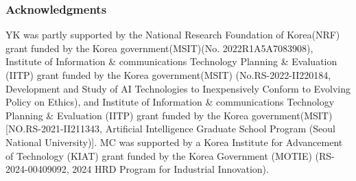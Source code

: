 \documentclass[10pt]{article} %
\begin{document}


\subsubsection*{Acknowledgments}


YK was partly supported by 
the National Research Foundation of Korea(NRF) grant funded by the Korea government(MSIT)(No. 2022R1A5A7083908),
Institute of Information \& communications Technology Planning \& Evaluation (IITP) grant funded by the Korea government(MSIT) (No.RS-2022-II220184, Development and Study of AI Technologies to Inexpensively Conform to Evolving Policy on Ethics),
and Institute of Information \& communications Technology Planning \& Evaluation (IITP) grant funded by the Korea government(MSIT) [NO.RS-2021-II211343, Artificial Intelligence Graduate School Program (Seoul National University)].
MC was supported by a Korea Institute for Advancement of Technology (KIAT) grant funded by the Korea Government (MOTIE) (RS-2024-00409092, 2024 HRD Program for Industrial Innovation).



\clearpage




\clearpage
\appendix





\end{document}

